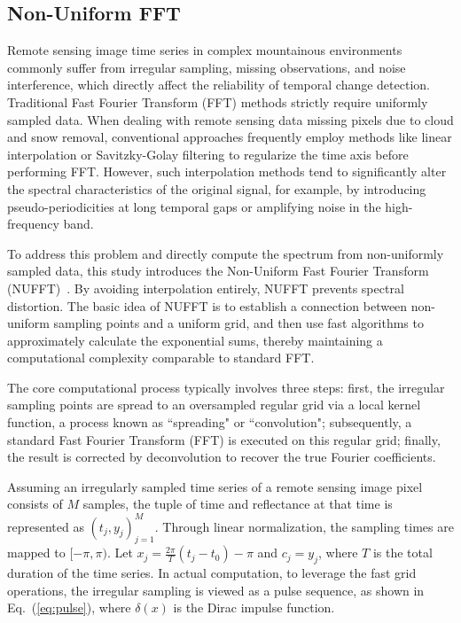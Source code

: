 \documentclass[letterpaper,journal]{IEEEtran}
\begin{document}
\subsection{Non-Uniform FFT}

Remote sensing image time series in complex mountainous environments commonly suffer from irregular sampling, missing observations, and noise interference, which directly affect the reliability of temporal change detection. Traditional Fast Fourier Transform (FFT) methods strictly require uniformly sampled data. When dealing with remote sensing data missing pixels due to cloud and snow removal, conventional approaches frequently employ methods like linear interpolation or Savitzky-Golay filtering to regularize the time axis before performing FFT. However, such interpolation methods tend to significantly alter the spectral characteristics of the original signal, for example, by introducing pseudo-periodicities at long temporal gaps or amplifying noise in the high-frequency band.

To address this problem and directly compute the spectrum from non-uniformly sampled data, this study introduces the Non-Uniform Fast Fourier Transform (NUFFT)~\cite{ref4,ref6}. By avoiding interpolation entirely, NUFFT prevents spectral distortion. The basic idea of NUFFT is to establish a connection between non-uniform sampling points and a uniform grid, and then use fast algorithms to approximately calculate the exponential sums, thereby maintaining a computational complexity comparable to standard FFT.

The core computational process typically involves three steps: first, the irregular sampling points are spread to an oversampled regular grid via a local kernel function, a process known as ``spreading" or ``convolution"; subsequently, a standard Fast Fourier Transform (FFT) is executed on this regular grid; finally, the result is corrected by deconvolution to recover the true Fourier coefficients.

Assuming an irregularly sampled time series of a remote sensing image pixel consists of $M$ samples, the tuple of time and reflectance at that time is represented as $(t_j, y_j)_{j=1}^M$. Through linear normalization, the sampling times are mapped to $[-\pi, \pi)$. Let $x_j = \frac{2\pi}{T}(t_j - t_0) - \pi$ and $c_j = y_j$, where $T$ is the total duration of the time series. In actual computation, to leverage the fast grid operations, the irregular sampling is viewed as a pulse sequence, as shown in Eq.~(\ref{eq:pulse}), where $\delta(x)$ is the Dirac impulse function.
\end{document}
